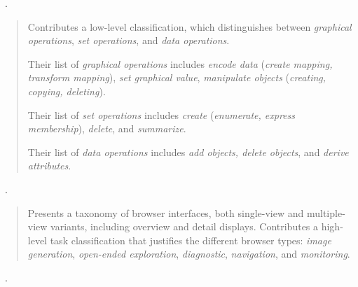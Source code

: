 \begin{sloppypar}
~\cite{Chuah1996}. \end{sloppypar}

\begin{quotation}
    Contributes a low-level classification, which distinguishes between {\it graphical operations}, {\it set operations}, and {\it data operations}.
    
    Their list of {\it graphical operations} includes {\it encode data} ({\it create mapping, transform mapping}), {\it set graphical value}, {\it manipulate objects} ({\it creating, copying, deleting}).
    
    Their list of {\it set operations} includes {\it create} ({\it enumerate, express membership}), {\it delete}, and {\it summarize}.
    
    Their list of {\it data operations} includes {\it add objects, delete objects}, and {\it derive attributes}.
\end{quotation}

\begin{sloppypar}
~\cite{Plaisant1995}. \end{sloppypar}

\begin{quotation}
    Presents a taxonomy of browser interfaces, both single-view and multiple-view variants, including overview and detail displays. 
    Contributes a high-level task classification that justifies the different browser types: {\it image generation}, {\it open-ended exploration}, {\it diagnostic}, {\it navigation}, and {\it monitoring}.
\end{quotation}

\begin{sloppypar}
~\cite{Roth2012a}. \end{sloppypar}

